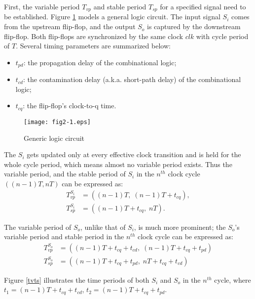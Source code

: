 First, the variable period $T_{vp}$ and stable period $T_{sp}$ for a specified signal need to be established. Figure \ref{comb} models a general logic circuit. The input signal $S_i$ comes from the upstream flip-flop, and the output $S_o$ is captured by the downstream flip-flop. Both flip-flops are synchronized by the same clock $clk$ with cycle period of $T$. Several timing parameters are summarized below:
\begin{itemize}
    \item $t_{pd}$:  the  propagation delay of the combinational logic;

    \item $t_{cd}$:  the  contamination delay (a.k.a. short-path delay) of the combinational logic;

    \item $t_{cq}$: the flip-flop's  clock-to-q time.
\end{itemize}

\begin{figure}[t]
\centering
\texttt{[image: fig2-1.eps]}
  \vspace{-0.5em} 
  \caption{Generic logic circuit}
  \label{comb}
\end{figure}

The $S_i$ gets updated only at every effective clock transition and is held for the whole cycle period, which means almost no variable period exists. Thus the variable period, and the stable period of $S_i$ in the $n^{th}$ clock cycle $((n-1)T, nT)$ can be expressed as:
\begin{align}
T_{vp}^{S_i}&=((n-1)T, \;(n-1)T+t_{cq}), \\
T_{sp}^{S_i}&=((n-1)T +t_{cq}, \;nT).
\end{align}

The variable period of $S_o$, unlike that of $S_i$, is much more prominent; the $S_o$'s  variable period and stable period in the $n^{th}$ clock cycle can be expressed as:
 \begin{align}
T_{vp}^{S_o}&=((n-1)T+t_{cq}+t_{cd},\; (n-1)T+t_{cq}+t_{pd}) \\
T_{sp}^{S_o}&=((n-1)T+t_{cq}+t_{pd},\; nT+t_{cq}+t_{cd}) \label{SoSP}
\end{align}

Figure \ref{tvts} illustrates the time periods of both $S_i$ and $S_o$ in the $n^{th}$ cycle, where $t_{1}=(n-1)T+t_{cq}+t_{cd}$, $t_{2}=(n-1)T+t_{cq}+t_{pd}$.

